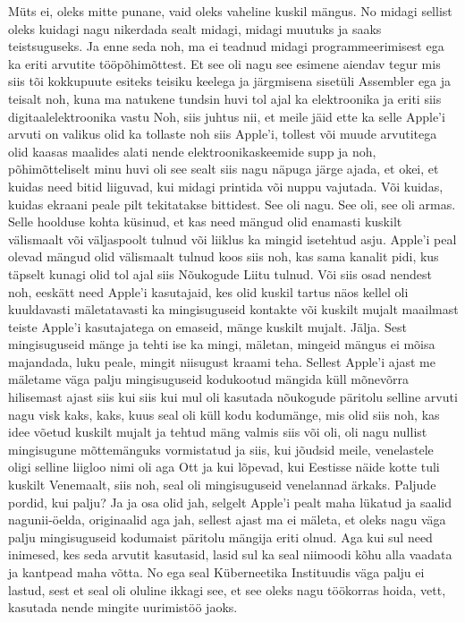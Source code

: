 Müts ei, oleks mitte punane, vaid oleks vaheline kuskil mängus. No midagi sellist oleks kuidagi nagu nikerdada sealt midagi, midagi muutuks ja saaks teistsuguseks. Ja enne seda noh, ma ei teadnud midagi programmeerimisest ega ka eriti arvutite tööpõhimõttest. Et see oli nagu see esimene aiendav tegur mis siis tõi kokkupuute esiteks teisiku keelega ja järgmisena sisetüli Assembler ega ja teisalt noh, kuna ma natukene tundsin huvi tol ajal ka elektroonika ja eriti siis digitaalelektroonika vastu
Noh, siis juhtus nii, et meile jäid ette ka selle Apple'i arvuti on valikus olid ka tollaste noh siis Apple'i, tollest või muude arvutitega olid kaasas maalides alati nende elektroonikaskeemide supp ja noh, põhimõtteliselt minu huvi oli see sealt siis nagu näpuga järge ajada, et okei, et kuidas need bitid liiguvad, kui midagi printida või nuppu vajutada. Või kuidas, kuidas ekraani peale pilt tekitatakse bittidest.
See oli nagu.
See oli, see oli armas. Selle hoolduse kohta küsinud, et kas need mängud olid enamasti kuskilt välismaalt või väljaspoolt tulnud või liiklus ka mingid isetehtud asju.
Apple'i peal olevad mängud olid välismaalt tulnud koos siis noh, kas sama kanalit pidi, kus täpselt kunagi olid tol ajal siis Nõukogude Liitu tulnud. Või siis osad nendest noh, eeskätt need Apple'i kasutajaid, kes olid kuskil tartus näos kellel oli kuuldavasti mäletatavasti ka mingisuguseid kontakte või kuskilt mujalt maailmast teiste Apple'i kasutajatega on emaseid, mänge kuskilt mujalt. Jälja.
Sest mingisuguseid mänge ja tehti ise ka mingi, mäletan, mingeid mängus ei mõisa majandada, luku peale, mingit niisugust kraami teha.
Sellest Apple'i ajast me mäletame väga palju mingisuguseid kodukootud mängida küll mõnevõrra hilisemast ajast siis kui siis kui mul oli kasutada nõukogude päritolu selline arvuti nagu visk kaks, kaks, kuus seal oli küll kodu kodumänge, mis olid siis noh, kas idee võetud kuskilt mujalt ja tehtud mäng valmis siis või oli, oli nagu nullist mingisugune mõttemänguks vormistatud ja siis, kui jõudsid meile, venelastele oligi selline liigloo nimi oli aga Ott ja kui lõpevad, kui Eestisse näide kotte tuli kuskilt Venemaalt, siis noh, seal oli mingisuguseid venelannad ärkaks.
Paljude pordid, kui palju?
Ja ja osa olid jah, selgelt Apple'i pealt maha lükatud ja saalid nagunii-öelda, originaalid aga jah, sellest ajast ma ei mäleta, et oleks nagu väga palju mingisuguseid kodumaist päritolu mängija eriti olnud.
Aga kui sul need inimesed, kes seda arvutit kasutasid, lasid sul ka seal niimoodi kõhu alla vaadata ja kantpead maha võtta.
No ega seal Küberneetika Instituudis väga palju ei lastud, sest et seal oli oluline ikkagi see, et see oleks nagu töökorras hoida, vett, kasutada nende mingite uurimistöö jaoks.
